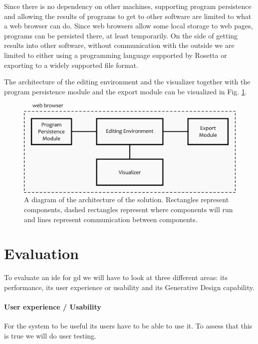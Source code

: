 \documentclass{./llncs2e/llncs}
\begin{document}
	Since there is no dependency on other machines, supporting program persistence and allowing the results of programs to get to other software are limited to what a web browser can do.
	Since web browsers allow some local storage to web pages, programs can be persisted there, at least temporarily.
	On the side of getting results into other software, without communication with the outside we are limited to either using a programming language supported by Rosetta or exporting to a widely supported file format.
	
	The architecture of the editing environment and the visualizer together with the program persistence module and the export module can be visualized in Fig. \ref{fig:gen:sol}.
	
	\begin{figure}
		\centering
		\includegraphics[width=1.0\textwidth]{img/gen_sol}
		\caption{A diagram of the architecture of the solution. Rectangles represent components, dashed rectangles represent where components will run and lines represent communication between components.}
		\label{fig:gen:sol}
	\end{figure}	

\section{Evaluation}
	To evaluate an \ac{ide} for \ac{gd} we will have to look at three different areas:
	its performance, its user experience or usability and its Generative Design capability.
	
	\paragraph{User experience / Usability}
	For the system to be useful its users have to be able to use it.
	To assess that this is true we will do user testing.
	
\end{document}
